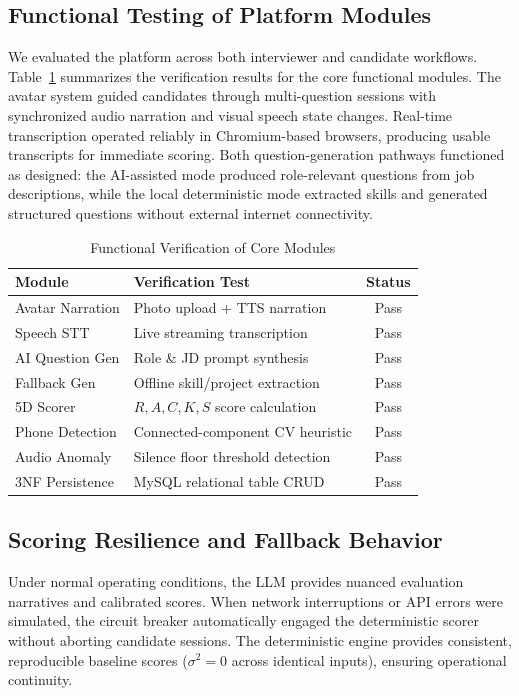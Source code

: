 \documentclass[conference]{IEEEtran}
\begin{document}
\subsection{Functional Testing of Platform Modules}

We evaluated the platform across both interviewer and candidate workflows. Table~\ref{tab:verification} summarizes the verification results for the core functional modules. The avatar system guided candidates through multi-question sessions with synchronized audio narration and visual speech state changes. Real-time transcription operated reliably in Chromium-based browsers, producing usable transcripts for immediate scoring. Both question-generation pathways functioned as designed: the AI-assisted mode produced role-relevant questions from job descriptions, while the local deterministic mode extracted skills and generated structured questions without external internet connectivity.

\begin{table}[htbp]
\caption{Functional Verification of Core Modules}
\label{tab:verification}
\centering
\renewcommand{\arraystretch}{1.2}
\begin{tabular}{p{}p{}c}
\toprule
\textbf{Module} & \textbf{Verification Test} & \textbf{Status}\\
\midrule
Avatar Narration & Photo upload + TTS narration & Pass\\
Speech STT & Live streaming transcription & Pass\\
AI Question Gen & Role \& JD prompt synthesis & Pass\\
Fallback Gen & Offline skill/project extraction & Pass\\
5D Scorer & $R, A, C, K, S$ score calculation & Pass\\
Phone Detection & Connected-component CV heuristic & Pass\\
Audio Anomaly & Silence floor threshold detection & Pass\\
3NF Persistence & MySQL relational table CRUD & Pass\\
\bottomrule
\end{tabular}
\end{table}

\subsection{Scoring Resilience and Fallback Behavior}

Under normal operating conditions, the LLM provides nuanced evaluation narratives and calibrated scores. When network interruptions or API errors were simulated, the circuit breaker automatically engaged the deterministic scorer without aborting candidate sessions. The deterministic engine provides consistent, reproducible baseline scores ($\sigma^2 = 0$ across identical inputs), ensuring operational continuity.
\end{document}
